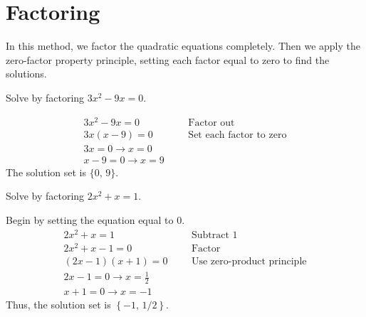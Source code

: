 \section{Factoring}
In this method, we factor the quadratic equations completely. Then we apply the zero-factor property principle, setting each factor equal to zero to find the solutions.
\begin{exa}
    Solve by factoring $3x^2-9x=0$.
\end{exa}
\vspace{-0.4cm}
\begin{align*}
    3x^2-9x=0&  &&\text{Factor out}\\
    3x(x-9)=0&  &&\text{Set each factor to zero}\\
    3x=0 \longrightarrow x=0&   &&\\
    x-9=0  \longrightarrow x=9& &&
\end{align*}
The solution set is $\{0,\, 9\}$.
\begin{exa}
    Solve by factoring $2x^2+x=1$.
\end{exa}
Begin by setting the equation equal to $0$.
\begin{align*}
    2x^2+x=1&   &&\text{Subtract 1}\\
    2x^2+x-1=0& &&\text{Factor}\\
    (2x-1)(x+1)=0&  &&\text{Use zero-product principle}\\
    2x-1=0 \longrightarrow x=\frac{1}{2}&   &&\\
    x+1=0  \longrightarrow x=-1& &&
\end{align*}
Thus, the solution set is $\left\{-1,\,1/2\right\}$.

